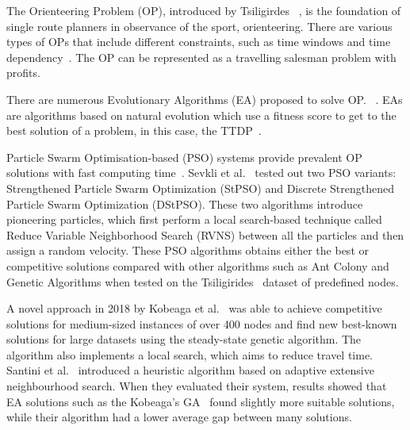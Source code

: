 The Orienteering Problem (OP), introduced by Tsiligirdes
~\cite{Tsiligirides1984}, is the foundation of
single route planners in observance of the sport, orienteering. There are
various types of OPs that include different constraints, such as time windows
and time dependency~\cite{Gunawan2016}. The OP can be represented as a
travelling salesman problem with profits. 

%

There are numerous Evolutionary Algorithms (EA) proposed to solve OP.\@
~\cite{Kobeaga2018,Wang2008}. EAs are algorithms based on natural evolution which
use a fitness score to get to the best solution of a problem, in this case, the
TTDP~\cite{Gunawan2016}.



Particle Swarm Optimisation-based (PSO) systems provide prevalent OP solutions
with fast computing time~\cite{Yu2019}.  Sevkli
et al.~\cite{Sevkli2010,Sevkli2010a} tested out two PSO variants:
Strengthened Particle Swarm Optimization (StPSO) and Discrete Strengthened
Particle Swarm Optimization (DStPSO). These two algorithms introduce pioneering
particles, which first perform a local search-based technique called Reduce
Variable Neighborhood Search (RVNS) between all the particles and then assign a
random velocity. These PSO algorithms obtains either the best or competitive
solutions compared with other algorithms such as Ant Colony and Genetic
Algorithms when tested on the Tsiligirides~\cite{Tsiligirides1984, Chen2011a}
dataset of predefined nodes.

A novel approach in 2018  by Kobeaga et al.~\cite{Kobeaga2018} was able to
achieve competitive solutions for medium-sized instances of over 400 nodes and
find new best-known solutions for large datasets using the steady-state genetic
algorithm. The algorithm also implements a local search, which aims to reduce
travel time. Santini et al.~\cite{Santini2019} introduced a heuristic algorithm
based on adaptive extensive neighbourhood search. When they evaluated their
system, results showed that EA solutions such as the Kobeaga's GA~\cite{Kobeaga2018} found slightly more suitable
solutions, while their algorithm had a lower average gap between many
solutions.

